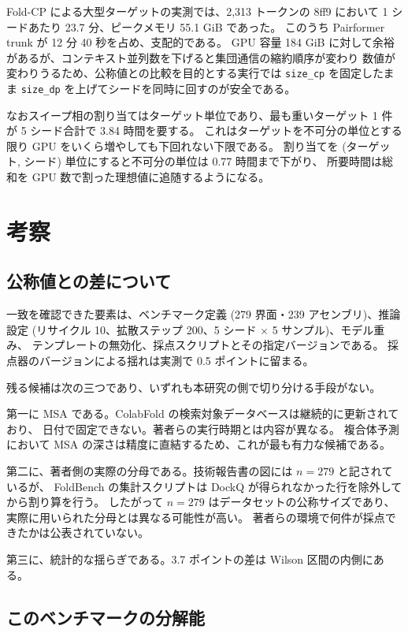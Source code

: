 \documentclass[11pt,a4paper]{article}
\begin{document}
Fold-CP による大型ターゲットの実測では、2,313 トークンの 8ff9 において
1 シードあたり 23.7 分、ピークメモリ 55.1 GiB であった。
このうち Pairformer trunk が 12 分 40 秒を占め、支配的である。
GPU 容量 184 GiB に対して余裕があるが、コンテキスト並列数を下げると集団通信の縮約順序が変わり
数値が変わりうるため、公称値との比較を目的とする実行では \texttt{size\_cp} を固定したまま
\texttt{size\_dp} を上げてシードを同時に回すのが安全である。

なおスイープ相の割り当てはターゲット単位であり、最も重いターゲット 1 件が 5 シード合計で 3.84 時間を要する。
これはターゲットを不可分の単位とする限り GPU をいくら増やしても下回れない下限である。
割り当てを (ターゲット, シード) 単位にすると不可分の単位は 0.77 時間まで下がり、
所要時間は総和を GPU 数で割った理想値に追随するようになる。

\section{考察}

\subsection{公称値との差について}

一致を確認できた要素は、ベンチマーク定義 (279 界面・239 アセンブリ)、推論設定
(リサイクル 10、拡散ステップ 200、5 シード $\times$ 5 サンプル)、モデル重み、
テンプレートの無効化、採点スクリプトとその指定バージョンである。
採点器のバージョンによる揺れは実測で 0.5 ポイントに留まる。

残る候補は次の三つであり、いずれも本研究の側で切り分ける手段がない。

第一に MSA である。ColabFold の検索対象データベースは継続的に更新されており、
日付で固定できない。著者らの実行時期とは内容が異なる。
複合体予測において MSA の深さは精度に直結するため、これが最も有力な候補である。

第二に、著者側の実際の分母である。技術報告書の図には $n=279$ と記されているが、
FoldBench の集計スクリプトは DockQ が得られなかった行を除外してから割り算を行う。
したがって $n=279$ はデータセットの公称サイズであり、実際に用いられた分母とは異なる可能性が高い。
著者らの環境で何件が採点できたかは公表されていない。

第三に、統計的な揺らぎである。3.7 ポイントの差は Wilson 区間の内側にある。

\subsection{このベンチマークの分解能}
\label{sec:resolution}
\end{document}
